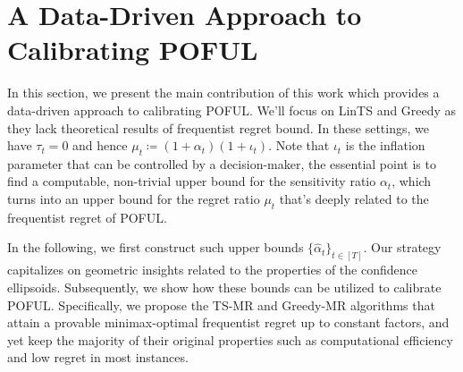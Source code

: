 \section{A Data-Driven Approach to Calibrating POFUL}






In this section, we present the main contribution of this work which provides a data-driven approach to calibrating POFUL. We'll focus on LinTS and Greedy as they lack theoretical results of frequentist regret bound. In these settings, we have $\tau_t = 0$ and hence $\mu_t  \coloneqq  (1+\alpha_t)(1+\iota_t )$. Note that $\iota_t$ is the inflation parameter that can be controlled by a decision-maker, the essential point is to find a computable, non-trivial upper bound for the sensitivity ratio $\alpha_t$, which turns into an upper bound for the regret ratio $\mu_t$ that's deeply related to the frequentist regret of POFUL.

 In the following, we first construct such upper bounds $\{\hat{\alpha}_t\}_{t\in[T]}$. Our strategy capitalizes on geometric insights related to the properties of the confidence ellipsoids. Subsequently, we show how these bounds can be utilized to calibrate POFUL. Specifically, we propose the TS-MR and Greedy-MR algorithms that attain a provable minimax-optimal frequentist regret up to constant factors, and yet keep the majority of their original properties such as computational efficiency and low regret in most instances.














